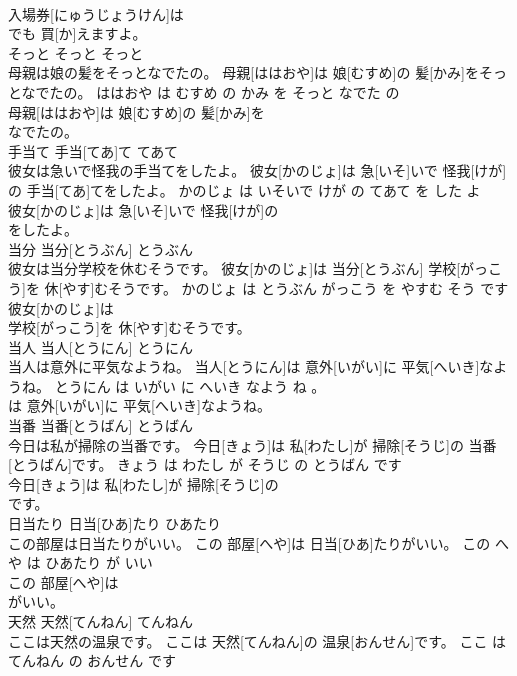 \documentclass[8pt]{extreport}
\begin{document}
\begin{CJK}{UTF8}{min}
\\	入場券[にゅうじょうけん]は
\\	でも 買[か]えますよ。			
\\	そっと	そっと	そっと	
\\	母親は娘の髪をそっとなでたの。	母親[ははおや]は 娘[むすめ]の 髪[かみ]をそっとなでたの。	ははおや は むすめ の かみ を そっと なでた の	
\\	母親[ははおや]は 娘[むすめ]の 髪[かみ]を
\\	なでたの。			
\\	手当て	手当[てあ]て	てあて	
\\	彼女は急いで怪我の手当てをしたよ。	彼女[かのじょ]は 急[いそ]いで 怪我[けが]の 手当[てあ]てをしたよ。	かのじょ は いそいで けが の てあて を した よ	
\\	彼女[かのじょ]は 急[いそ]いで 怪我[けが]の
\\	をしたよ。			
\\	当分	当分[とうぶん]	とうぶん	
\\	彼女は当分学校を休むそうです。	彼女[かのじょ]は 当分[とうぶん] 学校[がっこう]を 休[やす]むそうです。	かのじょ は とうぶん がっこう を やすむ そう です	
\\	彼女[かのじょ]は
\\	学校[がっこう]を 休[やす]むそうです。			
\\	当人	当人[とうにん]	とうにん	
\\	当人は意外に平気なようね。	当人[とうにん]は 意外[いがい]に 平気[へいき]なようね。	とうにん は いがい に へいき なよう ね 。	
\\	は 意外[いがい]に 平気[へいき]なようね。			
\\	当番	当番[とうばん]	とうばん	
\\	今日は私が掃除の当番です。	今日[きょう]は 私[わたし]が 掃除[そうじ]の 当番[とうばん]です。	きょう は わたし が そうじ の とうばん です	
\\	今日[きょう]は 私[わたし]が 掃除[そうじ]の
\\	です。			
\\	日当たり	日当[ひあ]たり	ひあたり	
\\	この部屋は日当たりがいい。	この 部屋[へや]は 日当[ひあ]たりがいい。	この へや は ひあたり が いい	
\\	この 部屋[へや]は
\\	がいい。			
\\	天然	天然[てんねん]	てんねん	
\\	ここは天然の温泉です。	ここは 天然[てんねん]の 温泉[おんせん]です。	ここ は てんねん の おんせん です	

\end{CJK}
\end{document}
